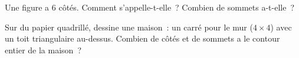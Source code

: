 \begin{exercise}[$\star$]\label{exo:g2:shapes:9}
Une figure a $6$ côtés. Comment s'appelle-t-elle~? Combien de
sommets a-t-elle~?
\end{exercise}

\begin{exercise}[$\star\star$]\label{exo:g2:shapes:10}
Sur du papier quadrillé, dessine une maison~: un carré pour le
mur ($4 \times 4$) avec un toit triangulaire au-dessus. Combien de
côtés et de sommets a le contour entier de la maison~?
\end{exercise}
